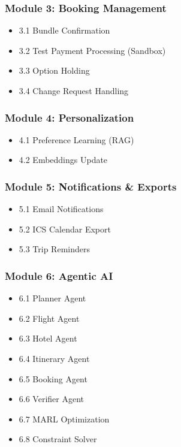\documentclass[12pt,a4paper]{article}
\begin{document}
\subsubsection{Module 3: Booking Management}

\begin{itemize}[leftmargin=*, itemsep=0.2em]
    \item 3.1 Bundle Confirmation
    \item 3.2 Test Payment Processing (Sandbox)
    \item 3.3 Option Holding
    \item 3.4 Change Request Handling
\end{itemize}

\subsubsection{Module 4: Personalization}

\begin{itemize}[leftmargin=*, itemsep=0.2em]
    \item 4.1 Preference Learning (RAG)
    \item 4.2 Embeddings Update
\end{itemize}

\subsubsection{Module 5: Notifications \& Exports}

\begin{itemize}[leftmargin=*, itemsep=0.2em]
    \item 5.1 Email Notifications
    \item 5.2 ICS Calendar Export
    \item 5.3 Trip Reminders
\end{itemize}

\subsubsection{Module 6: Agentic AI}

\begin{itemize}[leftmargin=*, itemsep=0.2em]
    \item 6.1 Planner Agent
    \item 6.2 Flight Agent
    \item 6.3 Hotel Agent
    \item 6.4 Itinerary Agent
    \item 6.5 Booking Agent
    \item 6.6 Verifier Agent
    \item 6.7 MARL Optimization
    \item 6.8 Constraint Solver
\end{itemize}
\end{document}
